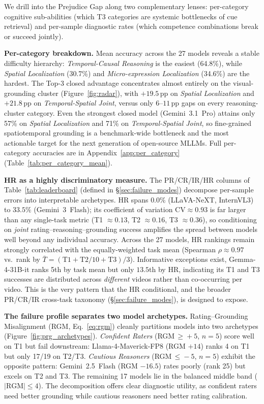 \documentclass{article}
\newcommand{\gapinv}{Prejudice Gap}
\begin{document}
We drill into the \gapinv{} along two complementary lenses: per-category cognitive sub-abilities (which T3 categories are systemic bottlenecks of cue retrieval) and per-sample diagnostic rates (which competence combinations break or succeed jointly).

\noindent\textbf{Per-category breakdown.} Mean accuracy across the 27 models reveals a stable difficulty hierarchy: \emph{Temporal-Causal Reasoning} is the easiest (64.8\%), while \emph{Spatial Localization} (30.7\%) and \emph{Micro-expression Localization} (34.6\%) are the hardest. The Top-3 closed advantage concentrates almost entirely on the visual-grounding cluster (Figure~\ref{fig:radar}), with $+19.5$\,pp on \emph{Spatial Localization} and $+21.8$\,pp on \emph{Temporal-Spatial Joint}, versus only $6$--$11$\,pp gaps on every reasoning-cluster category. Even the strongest closed model (Gemini~3.1~Pro) attains only 57\% on \emph{Spatial Localization} and 71\% on \emph{Temporal-Spatial Joint}, so fine-grained spatiotemporal grounding is a benchmark-wide bottleneck and the most actionable target for the next generation of open-source MLLMs. Full per-category accuracies are in Appendix~\ref{app:per_category} (Table~\ref{tab:per_category_mean}).

\noindent\textbf{HR as a highly discriminatory measure.} 
The PR/CR/IR/HR columns of Table~\ref{tab:leaderboard} (defined in \S\ref{sec:failure_modes}) decompose per-sample errors into interpretable archetypes. HR spans $0.0\%$ (LLaVA-NeXT, InternVL3) to $33.5\%$ (Gemini~3~Flash); its coefficient of variation $\text{CV}\!\approx\!0.93$ is far larger than any single-task metric (T1 $\approx\!0.13$, T2 $\approx\!0.16$, T3 $\approx\!0.36$), so conditioning on \emph{joint} rating--reasoning--grounding success amplifies the spread between models well beyond any individual accuracy. Across the 27 models, HR rankings remain strongly correlated with the equally-weighted task mean (Spearman $\rho\!\approx\!0.97$ vs.\ rank by $\bar{T}=(\text{T1}+\text{T2}/10+\text{T3})/3$). 
Informative exceptions exist, Gemma-4-31B-it ranks 5th by task mean but only $13.5$th by HR, indicating its T1 and T3 successes are distributed across \emph{different} videos rather than co-occurring per video. This is the very pattern that the HR conditional, and the broader PR/CR/IR cross-task taxonomy (\S\ref{sec:failure_modes}), is designed to expose.

\noindent\textbf{The failure profile separates two model archetypes.} Rating--Grounding Misalignment (RGM, Eq.~\ref{eq:rgm}) cleanly partitions models into two archetypes (Figure~\ref{fig:prg_archetypes}). \emph{Confident Raters} (RGM\,$\geq\!+5$, $n=5$) score well on T1 but fail downstream: Llama-4-Maverick-FP8 (RGM $+14$) ranks 4 on T1 but only 17/19 on T2/T3. \emph{Cautious Reasoners} (RGM\,$\leq\!-5$, $n=5$) exhibit the opposite pattern: Gemini~2.5~Flash (RGM $-16.5$) rates poorly (rank 25) but excels on T2 and T3. The remaining 17 models lie in the balanced middle band ($|\text{RGM}|\!\leq\!4$). The decomposition offers clear diagnostic utility, as confident raters need better grounding while cautious reasoners need better rating calibration.
\end{document}
